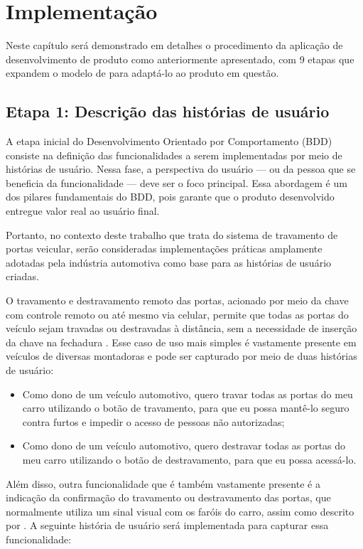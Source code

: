 \chapter{Implementação} 
\label{ch:IM}

Neste capítulo será demonstrado em detalhes o procedimento da aplicação de desenvolvimento de produto como anteriormente apresentado, 
com 9 etapas que expandem o modelo de  para adaptá-lo ao produto em questão.

\section{\textbf{Etapa 1: Descrição das histórias de usuário}}
\label{sbs:etapa1}
A etapa inicial do Desenvolvimento Orientado por Comportamento (BDD) consiste na definição das funcionalidades a serem implementadas por meio de histórias de usuário. 
Nessa fase, a perspectiva do usuário — ou da pessoa que se beneficia da funcionalidade — deve ser o foco principal. Essa abordagem é um dos pilares fundamentais do BDD, 
pois garante que o produto desenvolvido entregue valor real ao usuário final.

Portanto, no contexto deste trabalho que trata do sistema de travamento de portas veicular, serão consideradas implementações práticas amplamente adotadas pela 
indústria automotiva como base para as histórias de usuário criadas.

O travamento e destravamento remoto das portas, acionado por meio da chave com controle remoto ou até mesmo via celular, permite que todas as portas do veículo sejam 
travadas ou destravadas à distância, sem a necessidade de inserção da chave na fechadura \cite{bosch2022handbook}. Esse caso de uso mais simples é vastamente presente 
em veículos de diversas montadoras e pode ser capturado por meio de duas histórias de usuário:

\begin{itemize}
    \item Como dono de um veículo automotivo, quero travar todas as portas do meu carro utilizando o botão de travamento, para que eu possa mantê-lo seguro contra furtos e impedir o acesso de pessoas não autorizadas;
    \item Como dono de um veículo automotivo, quero destravar todas as portas do meu carro utilizando o botão de destravamento, para que eu possa acessá-lo.
\end{itemize}

Além disso, outra funcionalidade que é também vastamente presente é a indicação da confirmação do travamento ou destravamento das portas, que normalmente utiliza um 
sinal visual com os faróis do carro, assim como descrito por . A seguinte história de usuário será implementada para capturar essa funcionalidade:

